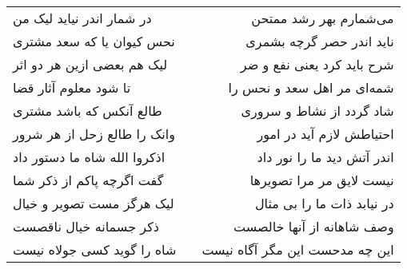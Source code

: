 \begin{center}
\begin{longtable}{l p{0.5cm} r}
در شمار اندر نیاید لیک من
&&
می‌شمارم بهر رشد ممتحن
\\
نحس کیوان یا که سعد مشتری
&&
ناید اندر حصر گرچه بشمری
\\
لیک هم بعضی ازین هر دو اثر
&&
شرح باید کرد یعنی نفع و ضر
\\
تا شود معلوم آثار قضا
&&
شمه‌ای مر اهل سعد و نحس را
\\
طالع آنکس که باشد مشتری
&&
شاد گردد از نشاط و سروری
\\
وانک را طالع زحل از هر شرور
&&
احتیاطش لازم آید در امور
\\
اذکروا الله شاه ما دستور داد
&&
اندر آتش دید ما را نور داد
\\
گفت اگرچه پاکم از ذکر شما
&&
نیست لایق مر مرا تصویرها
\\
لیک هرگز مست تصویر و خیال
&&
در نیابد ذات ما را بی مثال
\\
ذکر جسمانه خیال ناقصست
&&
وصف شاهانه از آنها خالصست
\\
شاه را گوید کسی جولاه نیست
&&
این چه مدحست این مگر آگاه نیست
\\
\end{longtable}
\end{center}
